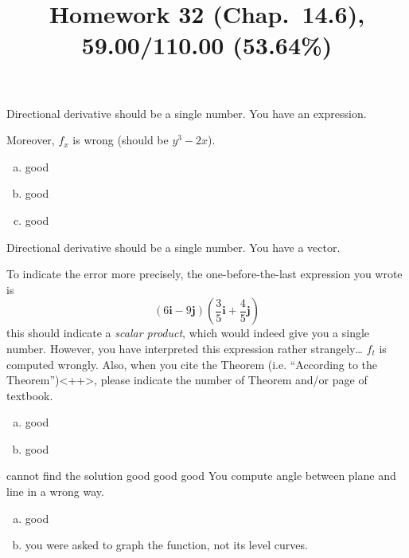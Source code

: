 \documentclass[pstricks,10pt,dvipsnames]{article} %
\title{Homework 32 (Chap.~14.6),
59.00/110.00 (53.64\%)
}
\begin{document}
\maketitle
{}
Directional derivative should be a single number. You have an expression.

Moreover, $f_x$ is wrong (should be $y^3-2x$).
\begin{enumerate}[(a)]
	\item good
	\item good
	\item good
\end{enumerate}
Directional derivative should be a single number. You have a vector.

To indicate the error more precisely, the one-before-the-last expression you wrote is
\begin{equation*}
	\left( 6\mathbf{i} -9\mathbf{j}\right)
	\left( \frac{3}{5}\mathbf{i}+\frac{4}{5}\mathbf{j} \right)
\end{equation*}
this should indicate a \textit{scalar product}, which would indeed give you a single number. However, you
have interpreted this expression rather strangely\dots
{}
$f_t$ is computed wrongly. Also, when you cite the Theorem (i.e. ``According to the Theorem'')<++>, please indicate the
number of Theorem and/or page of textbook.
\begin{enumerate}[(a)]
	\item good
	\item good
\end{enumerate}
cannot find the solution
good
good
good
You compute angle between plane and line in a wrong way.
\begin{enumerate}[(a)]
	\item good
	\item you were asked to graph the function, not its level curves.
\end{enumerate}
\end{document}
